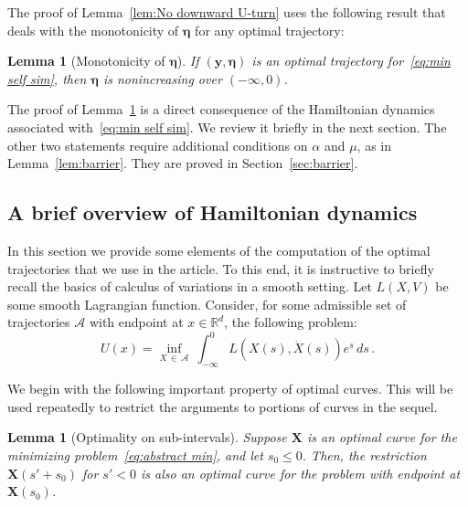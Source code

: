 \documentclass[10pt]{amsart}
\newtheorem{lemm}[theo]{Lemma}\newtheorem{prop}[theo]{Proposition}\newtheorem{coro}[theo]{Corollary}\newtheorem{conj}[theo]{Conjecture}
\theoremstyle{definition}\newtheorem{defi}[theo]{Definition}\newtheorem{rema}[theo]{Remark}\newtheorem{exam}[theo]{Example}\newtheorem{exem}[theo]{Example}\newtheorem{nota}[theo]{Notation}
\newcommand{\R}{\mathbb{R}}
\newcommand{\bX}{\mathbf{X}}
\newcommand{\by}{\mathbf{y}}
\newcommand{\mA}{\mathcal{A}}
\newcommand{\beeta}{\boldsymbol{\eta}}
\newcommand{\1}{\mathds{1}}
\begin{document}
The proof of Lemma~\ref{lem:No downward U-turn} uses the following result that deals with the monotonicity of $\beeta$ for any optimal trajectory:

\begin{lemm}[Monotonicity of $\beeta$]\label{lem:monotonicity}
If $(\by,\beeta)$ is an optimal trajectory for~\eqref{eq:min self sim}, then $\beeta$ is nonincreasing over $(-\infty,0)$.
\end{lemm}



The proof of Lemma~\ref{lem:monotonicity} is a direct consequence of the Hamiltonian dynamics associated with~\eqref{eq:min self sim}. We review it briefly in the next section. The other two statements require additional conditions on $\alpha$ and $\mu$, as in Lemma~\ref{lem:barrier}. They are proved in Section~\ref{sec:barrier}.



\subsection{A brief overview of Hamiltonian dynamics}\label{sec:hamiltonian}

In this section we provide some elements of the computation of the optimal trajectories that we use in the article. To this end, it is instructive to briefly recall the basics of calculus of variations in a smooth setting. Let $L(X,V)$ be some smooth Lagrangian function. Consider, for some admissible set of trajectories $\mA$ with endpoint at $x\in \R^d$, the following problem:
\begin{equation}\label{eq:abstract min}
U(x)= \inf_{X\,\in\,\mA}\ \int_{-\infty}^0 L\left(X(s),\dot X(s)\right) e^s\, ds\,.
\end{equation}


We begin with the following important property of optimal curves. This will be used repeatedly to restrict the arguments to portions of curves in the sequel.

\begin{lemm}[Optimality on sub-intervals]
Suppose $\bX$ is an optimal curve for the minimizing problem~\eqref{eq:abstract min}, and let $s_0\leq 0$. Then, the restriction $\bX(s'+s_0)$ for $s'<0$ is also an optimal curve for the problem with endpoint at $\bX(s_0)$.\label{lem:XX}
\end{lemm}
\end{document}
